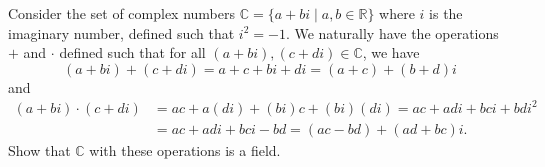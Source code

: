 
\begin{exer}\label{exer:cfield}
Consider the set of complex numbers $ \mathbb{C}=\{a+bi\mid a,b\in\mathbb{R}\} $ where $ i $ is the imaginary number, defined such that $ i^2=-1 $. We naturally have the operations $ + $ and $ \cdot $ defined such that for all $ (a+bi),(c+di)\in\mathbb{C} $, we have
\begin{equation*}
    (a+bi)+(c+di)=a+c+bi+di=(a+c)+(b+d)i
\end{equation*}
and
\begin{align*}
    (a+bi)\cdot(c+di) &= ac+a(di)+(bi)c+(bi)(di)=ac+adi+bci+bdi^2 \\
    &= ac+adi+bci-bd=(ac-bd)+(ad+bc)i.
\end{align*}
Show that $ \mathbb{C} $ with these operations is a field.
\end{exer}